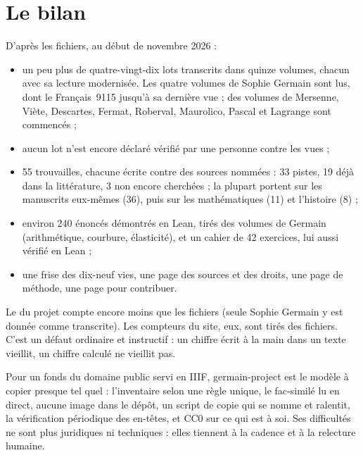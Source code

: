 \section{Le bilan}

D'après les fichiers, au début de novembre 2026 :
\begin{itemize}
  \item un peu plus de quatre-vingt-dix lots transcrits dans quinze volumes, chacun avec
        sa lecture modernisée. Les quatre volumes de Sophie Germain sont lus, dont le
        Français~9115 jusqu'à sa dernière vue ; des volumes de Mersenne, Viète, Descartes,
        Fermat, Roberval, Maurolico, Pascal et Lagrange sont commencés ;
  \item aucun lot n'est encore déclaré vérifié par une personne contre les vues ;
  \item 55 trouvailles, chacune écrite contre des sources nommées : 33 pistes, 19 déjà dans
        la littérature, 3 non encore cherchées ; la plupart portent sur les manuscrits
        eux-mêmes (36), puis sur les mathématiques (11) et l'histoire (8) ;
  \item environ 240 énoncés démontrés en Lean, tirés des volumes de Germain (arithmétique,
        courbure, élasticité), et un cahier de 42 exercices, lui aussi vérifié en Lean ;
  \item une frise des dix-neuf vies, une page des sources et des droits, une page de
        méthode, une page pour contribuer.
\end{itemize}

\begin{noteblock}
Le  du projet compte encore moins que les fichiers (seule Sophie Germain y
est donnée comme transcrite). Les compteurs du site, eux, sont tirés des fichiers. C'est
un défaut ordinaire et instructif : un chiffre écrit à la main dans un texte vieillit, un
chiffre calculé ne vieillit pas.
\end{noteblock}

\begin{exemple}
Pour un fonds du domaine public servi en IIIF, germain-project est le modèle à copier
presque tel quel : l'inventaire selon une règle unique, le fac-similé lu en direct, aucune
image dans le dépôt, un script de copie qui se nomme et ralentit, la vérification
périodique des en-têtes, et CC0 sur ce qui est à soi. Ses difficultés ne sont plus
juridiques ni techniques : elles tiennent à la cadence et à la relecture humaine.
\end{exemple}
